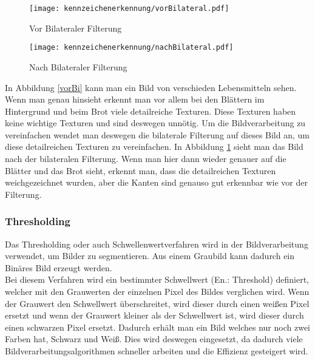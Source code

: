 \begin{figure}[htbp]
    \centering
    \begin{minipage}[t]{0.45\linewidth}
        \centering
        \texttt{[image: kennzeichenerkennung/vorBilateral.pdf]}
        \caption{Vor Bilateraler Filterung}
        \label{vorBi}
    \end{minipage}
    \hfill
    \begin{minipage}[t]{0.45\linewidth}
        \centering
        \texttt{[image: kennzeichenerkennung/nachBilateral.pdf]}
        \caption{Nach Bilateraler Filterung}
        \label{nachBi}
    \end{minipage}
\end{figure}

In Abbildung \ref{vorBi} kann man ein Bild von verschieden Lebensmitteln sehen. Wenn man genau hinsieht 
erkennt man vor allem bei den Blättern im Hintergrund und beim Brot viele detailreiche Texturen. 
Diese Texturen haben keine wichtige Texturen und sind deswegen unnötig. Um die Bildverarbeitung zu 
vereinfachen wendet man deswegen die bilaterale Filterung auf dieses Bild an, um diese detailreichen 
Texturen zu vereinfachen. In Abbildung \ref{nachBi} sieht man das Bild nach der bilateralen Filterung. 
Wenn man hier dann wieder genauer auf die Blätter und das Brot sieht, erkennt man, dass die 
detailreichen Texturen weichgezeichnet wurden, aber die Kanten sind genauso gut erkennbar wie vor der Filterung.

\subsubsection{Thresholding}
Das Thresholding oder auch Schwellenwertverfahren wird in der Bildverarbeitung verwendet, um Bilder zu segmentieren. 
Aus einem Graubild kann dadurch ein Binäres Bild erzeugt werden.\\ 

Bei diesem Verfahren wird ein bestimmter Schwellwert (En.: Threshold) definiert, welcher mit den Grauwerten der einzelnen 
Pixel des Bildes verglichen wird. Wenn der Grauwert den Schwellwert überschreitet, wird dieser durch einen weißen Pixel 
ersetzt und wenn der Grauwert kleiner als der Schwellwert ist, wird dieser durch einen schwarzen Pixel ersetzt. 
Dadurch erhält man ein Bild welches nur noch zwei Farben hat, Schwarz und Weiß. Dies wird deswegen eingesetzt, 
da dadurch viele Bildverarbeitungsalgorithmen schneller arbeiten und die Effizienz gesteigert wird.\\

